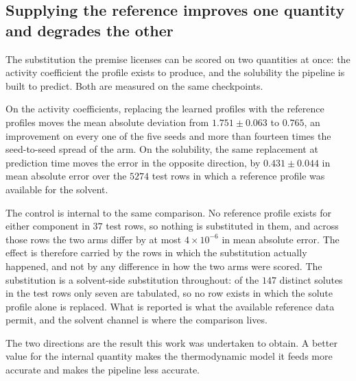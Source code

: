 \subsection{Supplying the reference improves one quantity and degrades the other}
\label{sec:twosided}

The substitution the premise licenses can be scored on two quantities at once: the activity
coefficient the profile exists to produce, and the solubility the pipeline is built to predict.
Both are measured on the same checkpoints.

On the activity coefficients, replacing the learned profiles with the reference profiles moves the
mean absolute deviation from $1.751\pm0.063$ to $0.765$, an improvement on every one of the five
seeds and more than fourteen times the seed-to-seed spread of the arm. On the solubility, the same
replacement at prediction time moves the error in the opposite direction, by $0.431\pm0.044$ in
mean absolute error over the $5274$ test rows in which a reference profile was available for the
solvent.

The control is internal to the same comparison. No reference profile exists for either component
in $37$ test rows, so nothing is substituted in them, and across those rows the two arms differ by
at most $4\times10^{-6}$ in mean absolute error. The effect is therefore carried by the rows in
which the substitution actually happened, and not by any difference in how the two arms were
scored. The substitution is a solvent-side substitution throughout: of the $147$ distinct solutes
in the test rows only seven are tabulated, so no row exists in which the solute profile alone is
replaced. What is reported is what the available reference data permit, and the solvent channel is
where the comparison lives.

The two directions are the result this work was undertaken to obtain. A better value for the
internal quantity makes the thermodynamic model it feeds more accurate and makes the pipeline less
accurate.